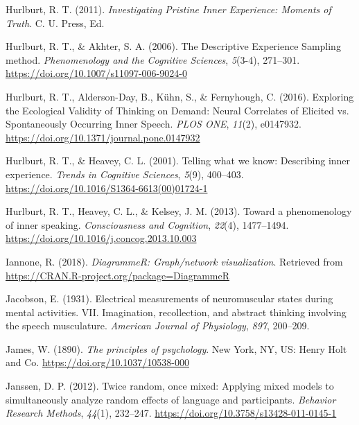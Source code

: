 \documentclass[a4paper,12pt,twoside,openright,oldfontcommands]{memoir}
\begin{document}
\leavevmode\hypertarget{ref-Hurlburt2011}{}%
Hurlburt, R. T. (2011). \emph{Investigating Pristine Inner Experience: Moments of Truth}. C. U. Press, Ed.

\leavevmode\hypertarget{ref-hurlburt_descriptive_2006}{}%
Hurlburt, R. T., \& Akhter, S. A. (2006). The Descriptive Experience Sampling method. \emph{Phenomenology and the Cognitive Sciences}, \emph{5}(3-4), 271--301. \url{https://doi.org/10.1007/s11097-006-9024-0}

\leavevmode\hypertarget{ref-hurlburt_exploring_2016}{}%
Hurlburt, R. T., Alderson-Day, B., Kühn, S., \& Fernyhough, C. (2016). Exploring the Ecological Validity of Thinking on Demand: Neural Correlates of Elicited vs. Spontaneously Occurring Inner Speech. \emph{PLOS ONE}, \emph{11}(2), e0147932. \url{https://doi.org/10.1371/journal.pone.0147932}

\leavevmode\hypertarget{ref-Hurlburt2001}{}%
Hurlburt, R. T., \& Heavey, C. L. (2001). Telling what we know: Describing inner experience. \emph{Trends in Cognitive Sciences}, \emph{5}(9), 400--403. \url{https://doi.org/10.1016/S1364-6613(00)01724-1}

\leavevmode\hypertarget{ref-Hurlburt2013}{}%
Hurlburt, R. T., Heavey, C. L., \& Kelsey, J. M. (2013). Toward a phenomenology of inner speaking. \emph{Consciousness and Cognition}, \emph{22}(4), 1477--1494. \url{https://doi.org/10.1016/j.concog.2013.10.003}

\leavevmode\hypertarget{ref-R-DiagrammeR}{}%
Iannone, R. (2018). \emph{DiagrammeR: Graph/network visualization}. Retrieved from \url{https://CRAN.R-project.org/package=DiagrammeR}

\leavevmode\hypertarget{ref-jacobson_electrical_1931}{}%
Jacobson, E. (1931). Electrical measurements of neuromuscular states during mental activities. VII. Imagination, recollection, and abstract thinking involving the speech musculature. \emph{American Journal of Physiology}, \emph{897}, 200--209.

\leavevmode\hypertarget{ref-james_principles_1890}{}%
James, W. (1890). \emph{The principles of psychology}. New York, NY, US: Henry Holt and Co. \url{https://doi.org/10.1037/10538-000}

\leavevmode\hypertarget{ref-janssen_twice_2012}{}%
Janssen, D. P. (2012). Twice random, once mixed: Applying mixed models to simultaneously analyze random effects of language and participants. \emph{Behavior Research Methods}, \emph{44}(1), 232--247. \url{https://doi.org/10.3758/s13428-011-0145-1}
\end{document}
